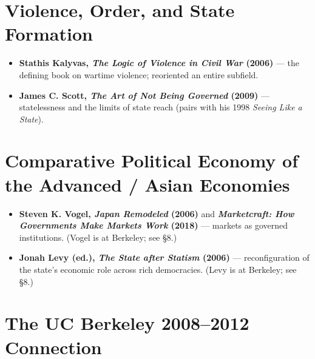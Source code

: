 \documentclass[12pt]{article}
\begin{document}
\section{Violence, Order, and State Formation}

\begin{itemize}[leftmargin=*, itemsep=4pt]
    \item \textbf{Stathis Kalyvas, \textit{The Logic of Violence in Civil War} (2006)} --- the defining book on wartime violence; reoriented an entire subfield.
    \item \textbf{James C. Scott, \textit{The Art of Not Being Governed} (2009)} --- statelessness and the limits of state reach (pairs with his 1998 \textit{Seeing Like a State}).
\end{itemize}

\section{Comparative Political Economy of the Advanced / Asian Economies}

\begin{itemize}[leftmargin=*, itemsep=4pt]
    \item \textbf{Steven K. Vogel, \textit{Japan Remodeled} (2006)} and \textbf{\textit{Marketcraft: How Governments Make Markets Work} (2018)} --- markets as governed institutions. (Vogel is at Berkeley; see \S8.)
    \item \textbf{Jonah Levy (ed.), \textit{The State after Statism} (2006)} --- reconfiguration of the state's economic role across rich democracies. (Levy is at Berkeley; see \S8.)
\end{itemize}

\section{The UC Berkeley 2008--2012 Connection}
\end{document}
